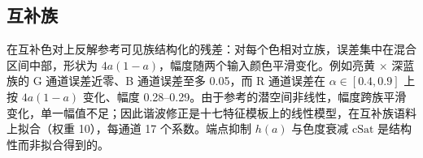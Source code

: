 \subsection{互补族}
在互补色对上反解参考可见族结构化的残差：对每个色相对立族，误差集中在混合区间中部，形状为 $4a(1-a)$，幅度随两个输入颜色平滑变化。例如亮黄 $\times$ 深蓝族的 G 通道误差近零、B 通道误差至多 0.05，而 R 通道误差在 $\alpha\in[0.4,0.9]$ 上按 $4a(1-a)$ 变化、幅度 0.28--0.29。由于参考的潜空间非线性，幅度跨族平滑变化，单一幅值不足；因此谐波修正是十七特征模板上的线性模型，在互补族语料上拟合（权重 10），每通道 17 个系数。端点抑制 $h(a)$ 与色度衰减 $\mathrm{cSat}$ 是结构性而非拟合得到的。
